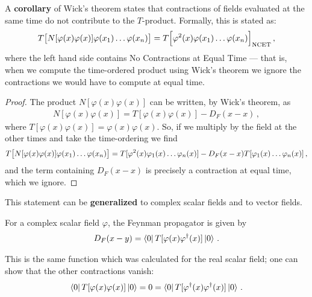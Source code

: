\documentclass[main.tex]{subfiles}
\begin{document}
A \textbf{corollary} of Wick's theorem states that contractions of fields evaluated at the same time do not contribute to the \(T\)-product. Formally, this is stated as: 
%
\begin{align}
T \qty[N[\varphi (x) \varphi (x)] \varphi (x_1 )\dots \varphi (x_n)]
= T \qty[\varphi^2(x) \varphi (x_1 )\dots \varphi (x_n)] _{\text{NCET}}
\,,
\end{align}
%
where the left hand side contains No Contractions at Equal Time --- that is, when we compute the time-ordered product using Wick's theorem we ignore the contractions we would have to compute at equal time.

\begin{proof}
The product \(N[\varphi (x) \varphi (x)]\) can be written, by Wick's theorem, as
%
\begin{align}
N[\varphi (x) \varphi (x)] = T[\varphi (x) \varphi (x)] - D_F (x - x)
\,,
\end{align}
%
where \(T[\varphi (x) \varphi (x)] = \varphi (x) \varphi (x)\). So, if we multiply by the field at the other times and take the time-ordering we find 
%
\begin{align}
T \qty[N[\varphi (x) \varphi (x)] \varphi (x_1 )\dots \varphi (x_n)]
= T[\varphi^2(x) \varphi_1 (x) \dots \varphi_n (x)]
- D_F(x-x) T[\varphi_1 (x) \dots \varphi_n (x)] 
\,,
\end{align}
%
and the term containing \(D_F( x-x)\) is precisely a contraction at equal time, which we ignore. 
\end{proof}

This statement can be \textbf{generalized} to complex scalar fields and to vector fields. 

\begin{definition}
For a complex scalar field \(\varphi \), the Feynman propagator is given by 
%
\begin{align}
D_F (x-y) = \bra{0} T [\varphi (x) \varphi ^\dag (x)] \ket{0}
\,.
\end{align}
\end{definition}

\begin{claim}
This is the same function which was calculated for the real scalar field; one can show that the other contractions vanish: 
%
\begin{align}
\bra{0} T[\varphi (x) \varphi (x)] \ket{0} 
= 0 = 
\bra{0} T[\varphi ^\dag(x) \varphi ^\dag (x)] \ket{0} 
\,.
\end{align}
\end{claim}
\end{document}
